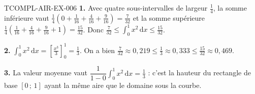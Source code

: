 \begin{corrige}{TCOMPL-AIR-EX-006}
\textbf{1.} Avec quatre sous-intervalles de largeur $\tfrac14$, la somme
inférieure vaut
$\tfrac14\left(0+\tfrac1{16}+\tfrac4{16}+\tfrac9{16}\right)=\tfrac{7}{32}$ et
la somme supérieure
$\tfrac14\left(\tfrac1{16}+\tfrac4{16}+\tfrac9{16}+1\right)=\tfrac{15}{32}$.
Donc $\tfrac{7}{32}\leq\int_0^1x^2\,\mathrm{d}x\leq\tfrac{15}{32}$.

\textbf{2.} $\int_0^1x^2\,\mathrm{d}x=\left[\tfrac{x^3}{3}\right]_0^1
=\tfrac13$. On a bien $\tfrac{7}{32}\approx0{,}219\leq\tfrac13\approx0{,}333
\leq\tfrac{15}{32}\approx0{,}469$.

\textbf{3.} La valeur moyenne vaut
$\dfrac{1}{1-0}\int_0^1x^2\,\mathrm{d}x=\tfrac13$ : c'est la hauteur du
rectangle de base $[0\,;\,1]$ ayant la même aire que le domaine sous la
courbe.
\end{corrige}
